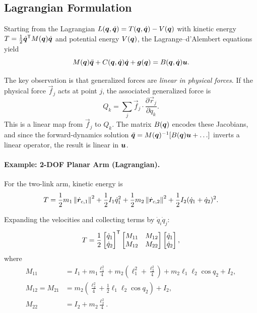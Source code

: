 \subsection{Lagrangian Formulation}

Starting from the Lagrangian $L(\bm{q},\dot{\bm{q}}) = T(\bm{q},\dot{\bm{q}}) - V(\bm{q})$ with kinetic energy
$T = \frac{1}{2}\dot{\bm{q}}^{\mathsf{T}} M(\bm{q})\dot{\bm{q}}$ and potential energy $V(\bm{q})$, the Lagrange--d'Alembert equations yield
\begin{equation}
M(\bm{q})\ddot{\bm{q}} + C(\bm{q},\dot{\bm{q}})\dot{\bm{q}} + \bm{g}(\bm{q}) = B(\bm{q},\dot{\bm{q}})\bm{u}.
\label{eq:ch3:lagrange}
\end{equation}

The key observation is that generalized forces are \emph{linear in physical forces}. If the
physical force $\vec{f}_j$ acts at point $j$, the associated generalized force is
\begin{equation}
Q_k = \sum_j \vec{f}_j \cdot \frac{\partial\vec{r}_j}{\partial q_k}.
\label{eq:ch3:generalized-force}
\end{equation}
This is a linear map from $\vec{f}_j$ to $Q_k$. The matrix $B(\bm{q})$ encodes these Jacobians,
and since the forward-dynamics solution $\ddot{\bm{q}} = M(\bm{q})^{-1}[B(\bm{q})\bm{u} + \ldots]$ inverts
a linear operator, the result is linear in $\bm{u}$.

\paragraph{Example: 2-DOF Planar Arm (Lagrangian).}

For the two-link arm, kinetic energy is
\begin{equation}
T = \frac{1}{2}m_1 \left\lVert \dot{\bm{r}}_{c,1} \right\rVert^2 + \frac{1}{2}I_1 \dot q_1^2
+ \frac{1}{2}m_2 \left\lVert \dot{\bm{r}}_{c,2} \right\rVert^2 + \frac{1}{2}I_2 (\dot q_1+\dot q_2)^2.
\end{equation}

Expanding the velocities and collecting terms by $\dot q_i \dot q_j$:
\begin{equation}
T = \frac{1}{2}\begin{bmatrix}\dot q_1 \\ \dot q_2\end{bmatrix}^{\mathsf{T}}
\begin{bmatrix} M_{11} & M_{12} \\ M_{12} & M_{22}\end{bmatrix}
\begin{bmatrix}\dot q_1 \\ \dot q_2\end{bmatrix},
\end{equation}
where
\begin{align}
M_{11} &= I_1 + m_1 \frac{\ell_1^2}{4} + m_2(\ell_1^2 + \frac{\ell_2^2}{4}) + m_2\ell_1\ell_2\cos q_2 + I_2, \\
M_{12} = M_{21} &= m_2(\frac{\ell_2^2}{4} + \frac{1}{2}\ell_1\ell_2\cos q_2) + I_2, \\
M_{22} &= I_2 + m_2 \frac{\ell_2^2}{4}.
\end{align}

